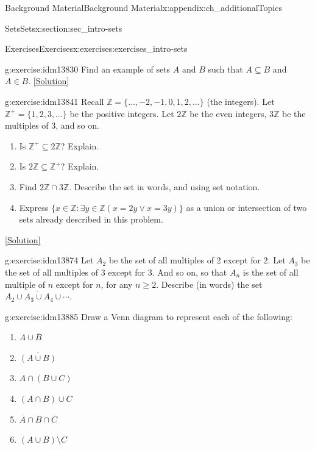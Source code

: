 \documentclass[oneside,10pt,]{book}
\numberwithin{equation}{chapter}
\def\Z{\mathbb Z}
\def\st{:}
\begin{document}
\begin{appendixptx}{Background Material}{}{Background Material}{}{}{x:appendix:ch_additionalTopics}
\begin{sectionptx}{Sets}{}{Sets}{}{}{x:section:sec_intro-sets}
\begin{exercises-subsection}{Exercises}{}{Exercises}{}{}{x:exercises:exercises_intro-sets}
\begin{divisionexercise}{4}{}{}{g:exercise:idm13830}%
Find an example of sets \(A\) and \(B\) such that \(A \subseteq B\) and \(A \in B\).%
\space\hspace*{0pt}\hfill{\tiny\hyperlink{g:solution:idm13837-main}{[Solution]}}\end{divisionexercise}%
\begin{divisionexercise}{5}{}{}{g:exercise:idm13841}%
Recall \(\Z = \{\ldots,-2,-1,0, 1,2,\ldots\}\) (the integers). Let \(\Z^+ = \{1, 2, 3, \ldots\}\) be the positive integers. Let \(2\Z\) be the even integers, \(3\Z\) be the multiples of 3, and so on.%
\par
%
\begin{enumerate}[label=(\alph*)]
\item{}Is \(\Z^+ \subseteq 2\Z\)? Explain.%
\item{}Is \(2\Z \subseteq \Z^+\)? Explain.%
\item{}Find \(2\Z \cap 3\Z\). Describe the set in words, and using set notation.%
\item{}Express \(\{x \in \Z \st \exists y\in \Z (x = 2y \vee x = 3y)\}\) as a union or intersection of two sets already described in this problem.%
\end{enumerate}
%
\space\hspace*{0pt}\hfill{\tiny\hyperlink{g:solution:idm13862-main}{[Solution]}}\end{divisionexercise}%
\begin{divisionexercise}{6}{}{}{g:exercise:idm13874}%
Let \(A_2\) be the set of all multiples of 2 except for \(2\). Let \(A_3\) be the set of all multiples of 3 except for 3. And so on, so that \(A_n\) is the set of all multiple of \(n\) except for \(n\), for any \(n \ge 2\). Describe (in words) the set \(\overline{A_2 \cup A_3 \cup A_4 \cup \cdots}\).%
\end{divisionexercise}%
\begin{divisionexercise}{7}{}{}{g:exercise:idm13885}%
Draw a Venn diagram to represent each of the following:%
\begin{enumerate}[label=(\alph*)]
\item{}\(A \cup \overline B\)%
\item{}\(\overline{(A \cup B)}\)%
\item{}\(A \cap (B \cup C)\)%
\item{}\((A \cap B) \cup C\)%
\item{}\(\overline A \cap B \cap \overline C\)%
\item{}\((A \cup B) \setminus C\)%

\end{enumerate}
\end{divisionexercise}
\end{exercises-subsection}
\end{sectionptx}
\end{appendixptx}
\end{document}

